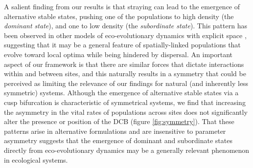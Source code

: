 \documentclass{revtex4}
\begin{document}

A salient finding from our results is that straying can lead to the emergence of alternative stable states, pushing one of the populations to high density (the \emph{dominant state}), and one to low density (the \emph{subordinate state}).
This pattern has been observed in other models of eco-evolutionary dynamics with explicit space \citep{Ronce:2001dp}, suggesting that it may be a general feature of spatially-linked populations that evolve toward local optima while being hindered by dispersal.
An important aspect of our framework is that there are similar forces that dictate interactions within and between sites, and this naturally results in a symmetry that could be perceived as limiting the relevance of our findings for natural (and inherently less symmetric) systems.
Although the emergence of alternative stable states via a cusp bifurcation is characteristic of symmetrical systems, we find that increasing the asymmetry in the vital rates of populations across sites does not significantly alter the presence or position of the DCB (figure \ref{fig:symmetry}).
That these patterns arise in alternative formulations and are insensitive to parameter asymmetry suggests that the emergence of dominant and subordinate states directly from eco-evolutionary dynamics may be a generally relevant phenomenon in ecological systems. %
\end{document}
